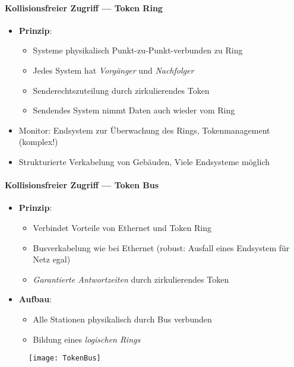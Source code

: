 \paragraph{Kollisionsfreier Zugriff --- Token Ring}
\begin{itemize}
  \item \textbf{Prinzip}:
  \begin{itemize}
    \item Systeme physikalisch Punkt-zu-Punkt-verbunden zu Ring
    \item Jedes System hat \emph{Vorgänger} und \emph{Nachfolger}
    \item Senderechtszuteilung durch zirkulierendes Token
    \item Sendendes System nimmt Daten auch wieder vom Ring
  \end{itemize}
  \item Monitor: Endsystem zur Überwachung des Rings, Tokenmanagement (komplex!)
  \item Strukturierte Verkabelung von Gebäuden, Viele Endsysteme möglich
\end{itemize}

\paragraph{Kollisionsfreier Zugriff --- Token Bus}
\begin{itemize}
  \item \textbf{Prinzip}:
  \begin{itemize}
    \item Verbindet Vorteile von Ethernet und Token Ring
    \item Busverkabelung wie bei Ethernet (robust: Ausfall eines Endsystem für Netz egal)
    \item \emph{Garantierte Antwortzeiten} durch zirkulierendes Token
  \end{itemize}
  \item \textbf{Aufbau}:
  \begin{itemize}
    \item Alle Stationen physikalisch durch Bus verbunden
    \item Bildung eines \emph{logischen Rings}
  \end{itemize}
\end{itemize}
\begin{figure}[H]\centering\label{TokenBus}\texttt{[image: TokenBus]}\end{figure}

